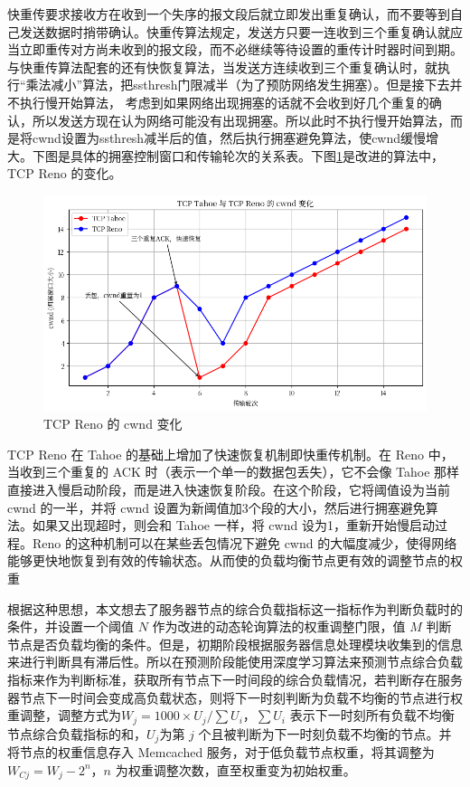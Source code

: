 快重传要求接收方在收到一个失序的报文段后就立即发出重复确认，而不要等到自己发送数据时捎带确认。快重传算法规定，发送方只要一连收到三个重复确认就应当立即重传对方尚未收到的报文段，而不必继续等待设置的重传计时器时间到期。
与快重传算法配套的还有快恢复算法，当发送方连续收到三个重复确认时，就执行“乘法减小”算法，把ssthresh门限减半（为了预防网络发生拥塞）。但是接下去并不执行慢开始算法，
考虑到如果网络出现拥塞的话就不会收到好几个重复的确认，所以发送方现在认为网络可能没有出现拥塞。所以此时不执行慢开始算法，而是将cwnd设置为ssthresh减半后的值，然后执行拥塞避免算法，使cwnd缓慢增大。下图是具体的拥塞控制窗口和传输轮次的关系表。下图\ref{tcp_reno}是改进的算法中，TCP Reno 的变化。

\begin{figure}[htbp]
  \centering
  \includegraphics[width=\textwidth]{figures/tcp_reno.png}
  \caption{TCP Reno 的 cwnd 变化}
  \label{tcp_reno}
\end{figure}

TCP Reno 在 Tahoe 的基础上增加了快速恢复机制即快重传机制。在 Reno 中，当收到三个重复的 ACK 时（表示一个单一的数据包丢失），它不会像 Tahoe 那样直接进入慢启动阶段，而是进入快速恢复阶段。在这个阶段，它将阈值设为当前 cwnd 的一半，并将 cwnd 设置为新阈值加3个段的大小，然后进行拥塞避免算法。如果又出现超时，则会和 Tahoe 一样，将 cwnd 设为1，重新开始慢启动过程。Reno 的这种机制可以在某些丢包情况下避免 cwnd 的大幅度减少，使得网络能够更快地恢复到有效的传输状态。从而使的负载均衡节点更有效的调整节点的权重

根据这种思想，本文想去了服务器节点的综合负载指标这一指标作为判断负载时的条件，并设置一个阈值 $N$ 作为改进的动态轮询算法的权重调整门限，值 $M$ 判断节点是否负载均衡的条件。但是，初期阶段根据服务器信息处理模块收集到的信息来进行判断具有滞后性。所以在预测阶段能使用深度学习算法来预测节点综合负载指标来作为判断标准，获取所有节点下一时间段的综合负载情况，若判断存在服务器节点下一时间会变成高负载状态，则将下一时刻判断为负载不均衡的节点进行权重调整，调整方式为$W_j = 1000 \times U_j / \sum U_i$，$\sum U_i$ 表示下一时刻所有负载不均衡节点综合负载指标的和，$U_j$为第 $j$ 个且被判断为下一时刻负载不均衡的节点。并将节点的权重信息存入 Memcached 服务，对于低负载节点权重，将其调整为 $W_{Cj} = W_j - 2^n$，$n$ 为权重调整次数，直至权重变为初始权重。

